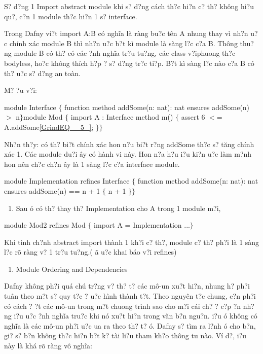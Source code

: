 \documentclass{article} %
\begin{document}
S? d?ng 1 Import abstract module khi s? d?ng c\'{a}ch th?c hi?n c? th? kh\^{o}ng hi?u qu?, c?n 1 module th?c hi?n 1 s? interface.

Trong Dafny vi?t import A:B c\'{o} ngh\~{i}a l\`{a} r\`{a}ng bu?c t\^{e}n A nhung thay v\`{i} nh?n {\dj}u?c ch\'{i}nh x\'{a}c module B th\`{i} nh?n {\dj}u?c b?t k\`{i} module l\`{a} s\`{a}ng l?c c?a B. Th\^{o}ng thu?ng module B c\'{o} th? c\'{o} c\'{a}c {\dj}?nh ngh\~{i}a tr?u tu?ng, c\'{a}c class v?iphuong th?c bodyless, ho?c kh\^{o}ng th\'{i}ch h?p {\dj}? s? d?ng tr?c ti?p. B?t k\`{i} s\`{a}ng l?c n\`{a}o c?a B c\'{o} th? {\dj}u?c s? d?ng an to\`{a}n.

\noindent M? {\dj}?u v?i: 

\noindent module Interface $\{$  function method addSome(n: nat): nat    ensures addSome(n) $>$ n$\}$module Mod $\{$  import A : Interface  method m() $\{$    assert 6 $<$= A.addSome\eqref{GrindEQ__5_};  $\}$$\}$

Nh?n th?y: c\'{o} th? bi?t ch\'{i}nh x\'{a}c hon n?u bi?t r?ng addSome th?c s? t\u{a}ng ch\'{i}nh x\'{a}c 1.  C\'{a}c module du?i {\dj}\^{a}y c\'{o} h\`{a}nh vi n\`{a}y. Hon n?a h?u {\dj}i?u ki?n {\dj}u?c l\`{a}m m?nh hon n\^{e}n ch?c ch?n {\dj}\^{a}y l\`{a} 1 s\`{a}ng l?c c?a interface module.

\noindent module Implementation refines Interface $\{$  function method addSome(n: nat): nat    ensures addSome(n) == n + 1  $\{$    n + 1  $\}$$\}$

\begin{enumerate}
\item  Sau {\dj}\'{o} c\'{o} th? thay th? Implementation cho A trong 1 module m?i,
\end{enumerate}

\noindent module Mod2 refines Mod $\{$  import A = Implementation  ...$\}$ 

Khi tinh ch?nh abstract import th\`{a}nh 1 kh?i c? th?, module c? th? ph?i l\`{a} 1 s\`{a}ng l?c r\~{o} r\`{a}ng v? 1 tr?u tu?ng.( {\dj}\~{a} {\dj}u?c khai b\'{a}o v?i refines) 

\noindent 

\begin{enumerate}
\item  Module Ordering and Dependencies
\end{enumerate}

Dafny kh\^{o}ng ph?i qu\'{a} ch\'{u} tr?ng v? th? t? c\'{a}c m\^{o}-{\dj}un xu?t hi?n, nhung h? ph?i tu\^{a}n theo m?t s? quy t?c {\dj}? {\dj}u?c h\`{i}nh th\`{a}nh t?t. Theo nguy\^{e}n t?c chung, c?n ph?i c\'{o} c\'{a}ch {\dj}? {\dj}?t c\'{a}c m\^{o}-{\dj}un trong m?t chuong tr\`{i}nh sao cho m?i c\'{a}i ch? {\dj}? c?p {\dj}?n nh?ng {\dj}i?u {\dj}u?c {\dj}?nh ngh\~{i}a tru?c khi n\'{o} xu?t hi?n trong v\u{a}n b?n ngu?n. {\DJ}i?u {\dj}\'{o} kh\^{o}ng c\'{o} ngh\~{i}a l\`{a} c\'{a}c m\^{o}-{\dj}un ph?i {\dj}u?c {\dj}ua ra theo th? t? {\dj}\'{o}. Dafny s? t\`{i}m ra l?nh {\dj}\'{o} cho b?n, gi? s? b?n kh\^{o}ng th?c hi?n b?t k? t\`{a}i li?u tham kh?o th\^{o}ng tu n\`{a}o. V\'{i} d?, {\dj}i?u n\`{a}y l\`{a} kh\'{a} r\~{o} r\`{a}ng v\^{o} ngh\~{i}a:
\end{document}
